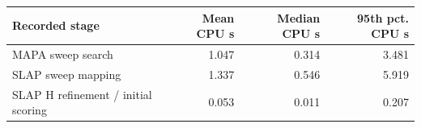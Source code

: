 \begin{tabular}{@{}lrrr@{}}\toprule
Recorded stage & Mean CPU s & Median CPU s & 95th pct. CPU s\\\midrule
MAPA sweep search & 1.047 & 0.314 & 3.481\\
SLAP sweep mapping & 1.337 & 0.546 & 5.919\\
SLAP H refinement / initial scoring & 0.053 & 0.011 & 0.207\\
\bottomrule\end{tabular}
